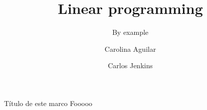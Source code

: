 \documentclass{beamer}
\begin{document}
\title{Linear programming}
\subtitle{By example}
\author{Carolina Aguilar \and Carlos Jenkins}
\frame{\titlepage}

\begin{frame}{Título de este marco}
Fooooo
\end{frame}
\end{document}

